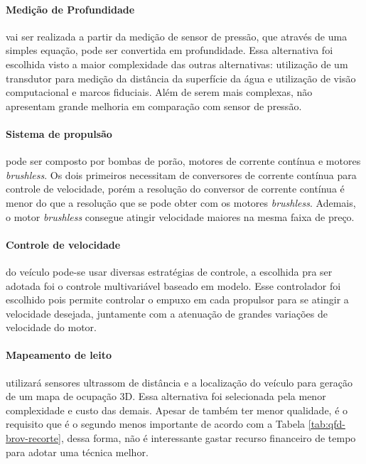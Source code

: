 \paragraph{Medição de Profundidade} vai ser realizada a partir da medição de sensor de pressão, que através de uma simples equação, pode ser convertida em profundidade. Essa alternativa foi escolhida visto a maior complexidade das outras alternativas: utilização de um transdutor para medição da distância da superfície da água e utilização de visão computacional e marcos fiduciais. Além de serem mais complexas, não apresentam grande melhoria em comparação com sensor de pressão.

\paragraph{Sistema de propulsão} pode ser composto por bombas de porão, motores de corrente contínua e motores \textit{brushless}. Os dois primeiros necessitam de conversores de corrente contínua para controle de velocidade, porém a resolução do conversor de corrente contínua é menor do que a resolução que se pode obter com os motores \textit{brushless}. Ademais, o motor \textit{brushless} consegue atingir velocidade maiores na mesma faixa de preço.

\paragraph{Controle de velocidade} do veículo pode-se usar diversas estratégias de controle, a escolhida pra ser adotada foi o controle multivariável baseado em modelo. Esse controlador foi escolhido pois permite controlar o empuxo em cada propulsor para se atingir a velocidade desejada, juntamente com a atenuação de grandes variações de velocidade do motor. 

\paragraph{Mapeamento de leito} utilizará sensores ultrassom de distância e a localização do veículo para geração de um mapa de ocupação 3D. Essa alternativa foi selecionada pela menor complexidade e custo das demais. Apesar de também ter menor qualidade, é o requisito que é o segundo menos importante de acordo com a Tabela \ref{tab:qfd-brov-recorte}, dessa forma, não é interessante gastar recurso financeiro de tempo para adotar uma técnica melhor.

